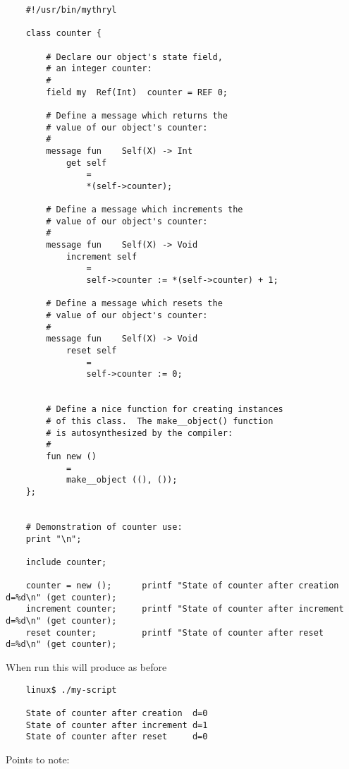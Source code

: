 \begin{verbatim}
    #!/usr/bin/mythryl

    class counter {

        # Declare our object's state field,
        # an integer counter:
        # 
        field my  Ref(Int)  counter = REF 0;

        # Define a message which returns the
        # value of our object's counter:
        #
        message fun    Self(X) -> Int
            get self
                =
                *(self->counter);

        # Define a message which increments the
        # value of our object's counter:
        #
        message fun    Self(X) -> Void
            increment self
                =
                self->counter := *(self->counter) + 1;

        # Define a message which resets the
        # value of our object's counter:
        #
        message fun    Self(X) -> Void
            reset self
                =
                self->counter := 0;


        # Define a nice function for creating instances
        # of this class.  The make__object() function
        # is autosynthesized by the compiler:
        #
        fun new ()
            =
            make__object ((), ());
    };


    # Demonstration of counter use:
    print "\n";

    include counter;

    counter = new ();      printf "State of counter after creation  d=%d\n" (get counter);
    increment counter;     printf "State of counter after increment d=%d\n" (get counter);
    reset counter;         printf "State of counter after reset     d=%d\n" (get counter);
\end{verbatim}

When run this will produce as before

\begin{verbatim}
    linux$ ./my-script

    State of counter after creation  d=0
    State of counter after increment d=1
    State of counter after reset     d=0
\end{verbatim}

Points to note:

